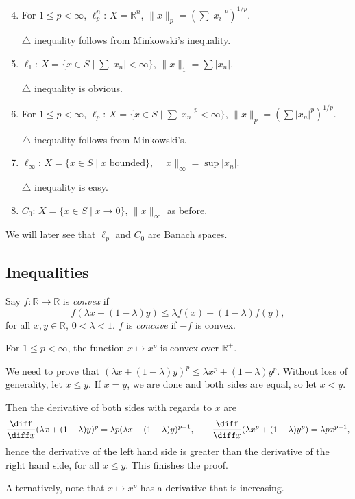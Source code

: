 \documentclass[12pt]{article}
\begin{document}
\begin{exbox}
	\begin{enumerate}
		\setcounter{enumi}{3}
		\item For $1 \leq p < \infty$, $\ell_p^n$: $X = \mathbb{R}^{n}$, $\|x\|_p = (\sum |x_i|^p)^{1/p}$.

			$\triangle$ inequality follows from Minkowski's inequality.
		\item $\ell_1$: $X = \{x \in S \mid \sum |x_n| < \infty\}$, $\|x\|_1 = \sum |x_n|$.

			$\triangle$ inequality is obvious.
		\item For $1 \leq p < \infty$, $\ell_p$: $X = \{x \in S \mid \sum |x_n|^p < \infty\}$, $\|x\|_p = (\sum |x_n|^p)^{1/p}$.

			$\triangle$ inequality follows from Minkowski's.
		\item $\ell_\infty$: $X = \{x \in S \mid x \text{ bounded}\}$, $\|x\|_\infty = \sup |x_n|$.

			$\triangle$ inequality is easy.
		\item $C_0$: $X = \{x \in S \mid x \to 0\}$, $\|x\|_\infty$ as before.
	\end{enumerate}
\end{exbox}

We will later see that $\ell_p$ and $C_0$ are Banach spaces.


\subsection{Inequalities}
\label{sub:inequalities}

Say $f : \mathbb{R} \to \mathbb{R}$ is \emph{convex} if
\[
f(\lambda x + (1-\lambda)y) \leq \lambda f(x) + (1-\lambda)f(y),
\]
for all $x, y \in \mathbb{R}$, $0 < \lambda < 1$. $f$ is \emph{concave} if $-f$ is convex.

\begin{lemma}
	For $1 \leq p < \infty$, the function $x \mapsto x^{p}$ is convex over $\mathbb{R}^{+}$.
\end{lemma}

\begin{proofbox}
	We need to prove that $(\lambda x + (1-\lambda)y)^{p} \leq \lambda x^{p} + (1-\lambda)y^{p}$. Without loss of generality, let $x \leq y$. If $x = y$, we are done and both sides are equal, so let $x < y$.

	Then the derivative of both sides with regards to $x$ are
	\[
	\frac{\diff}{\diff x}(\lambda x + (1-\lambda)y)^{p} = \lambda p(\lambda x + (1-\lambda)y)^{p-1}, \qquad \frac{\diff}{\diff x}(\lambda x^{p} + (1-\lambda)y^{p}) = \lambda p x^{p-1},
	\]
	hence the derivative of the left hand side is greater than the derivative of the right hand side, for all $x \leq y$. This finishes the proof.

	Alternatively, note that $x \mapsto x^{p}$ has a derivative that is increasing.
\end{proofbox}
\end{document}
